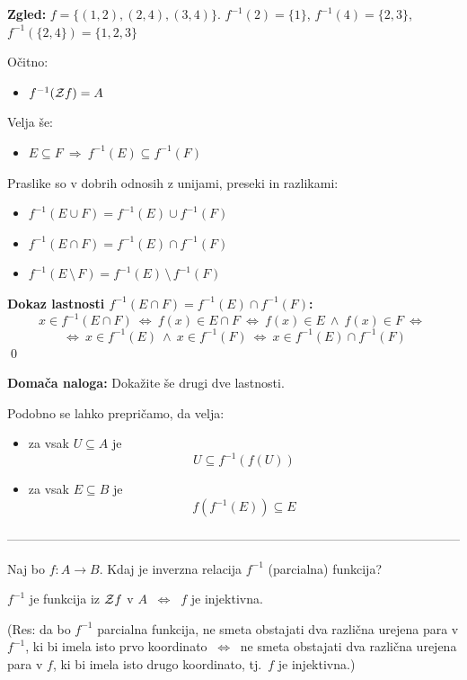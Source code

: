 \documentclass[11pt,paper=b5,DIV=13,headinclude,footinclude]{scrbook}
\def\inn {{~\wedge~}}
\def\sledi {{~\Rightarrow~}}
\def\brez {{\,\setminus\,}}
\def\cee {{~\Leftrightarrow~}}
\begin{document}
\medskip
\textbf{ Zgled:} $f = \{(1,2),(2,4),(3,4)\}$.
$f^{-1}(2) = \{1\}$, $f^{-1}(4) = \{2,3\}$, $f^{-1}(\{2,4\}) = \{1,2,3\}$
\medskip

Očitno:
\begin{itemize}
  \item $f^{-1}({\cal Z}f) = A$
\end{itemize}

\bigskip
Velja še:
\begin{itemize}
  \item $E\subseteq F\sledi f^{-1}(E)\subseteq f^{-1}(F)$
\end{itemize}

\bigskip
Praslike so v dobrih odnosih z unijami, preseki in razlikami:
\begin{itemize}
  \item $f^{-1}(E\cup F)= f^{-1}(E)\cup f^{-1}(F)$
  \item $f^{-1}(E\cap F)= f^{-1}(E)\cap f^{-1}(F)$
  \item $f^{-1}(E\brez F)= f^{-1}(E)\brez f^{-1}(F)$
\end{itemize}

\textbf{ Dokaz lastnosti $f^{-1}(E\cap F)= f^{-1}(E)\cap f^{-1}(F)$:}
$$x\in f^{-1}(E\cap F)\cee
f(x)\in E\cap F\cee
f(x)\in E \inn f(x)\in F\cee$$ $$\cee x\in f^{-1}(E) \inn x\in f^{-1}(F)
\cee x\in f^{-1}(E)\cap f^{-1}(F)$$
\qed

\textbf{ Domača naloga:} Dokažite še drugi dve lastnosti.

\bigskip
Podobno se lahko prepričamo, da velja:
\begin{itemize}
  \item za vsak $U\subseteq A$ je $$U\subseteq f^{-1}(f(U))$$
  \item za vsak $E\subseteq B$ je $$f(f^{-1}(E))\subseteq E$$
\end{itemize}

\bigskip

------------------------------------------------------------------------------------------------------------

\bigskip

Naj bo $f:A\to B$. Kdaj je inverzna relacija $f^{-1}$ (parcialna) funkcija?

\medskip
$f^{-1}$ je funkcija iz ${\cal Z}f$ v $A$ $\cee$ $f$ je injektivna.

(Res: da bo $f^{-1}$ parcialna funkcija, ne smeta obstajati dva različna urejena para v $f^{-1}$, ki bi imela isto prvo koordinato $\cee$ ne smeta obstajati dva različna urejena para v $f$, ki bi imela isto drugo koordinato, tj.~$f$ je injektivna.)
\end{document}

